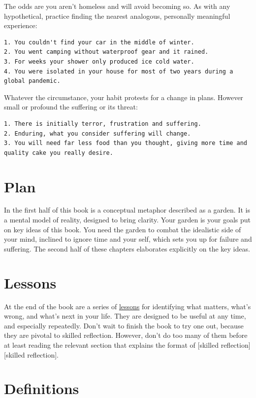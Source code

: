 \documentclass[
]{book}
\begin{document}
The odds are you aren't homeless and will avoid becoming so.
As with any hypothetical, practice finding the nearest analogous, personally meaningful experience:

\begin{verbatim}
1. You couldn't find your car in the middle of winter.
2. You went camping without waterproof gear and it rained.
3. For weeks your shower only produced ice cold water.
4. You were isolated in your house for most of two years during a global pandemic.  
\end{verbatim}

Whatever the circumstance, your habit protests for a change in plans.
However small or profound the suffering or its threat:

\begin{verbatim}
1. There is initially terror, frustration and suffering.
2. Enduring, what you consider suffering will change.
3. You will need far less food than you thought, giving more time and quality cake you really desire.   
\end{verbatim}

\section{Plan}\label{intro-plan}

In the first half of this book is a conceptual metaphor described as a garden.
It is a mental model of reality, designed to bring clarity.
Your garden is your goals put on key ideas of this book.
You need the garden to combat the idealistic side of your mind, inclined to ignore time and your self, which sets you up for failure and suffering.
The second half of these chapters elaborates explicitly on the key ideas.

\section{Lessons}\label{intro-lessons}

At the end of the book are a series of \hyperref[zero-or-one]{lessons} for identifying what matters, what's wrong, and what's next in your life.
They are designed to be useful at any time, and especially repeatedly.
Don't wait to finish the book to try one out, because they are pivotal to skilled reflection.
However, don't do too many of them before at least reading the relevant section that explains the format of {[}skilled reflection{]}{[}skilled reflection{]}.

\section{Definitions}\label{definitions}
\end{document}
